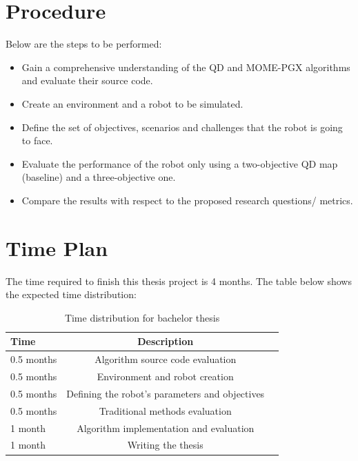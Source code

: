 \documentclass[12pt]{article}
\begin{document}
\section{Procedure}
Below are the steps to be performed:
\begin{itemize}
\item Gain a comprehensive understanding of the QD and MOME-PGX algorithms and evaluate their source code.
\item Create an environment and a robot to be simulated.
\item Define the set of objectives, scenarios and challenges that the robot is going to face.
\item Evaluate the performance of the robot only using a two-objective QD map (baseline) and a three-objective one.
\item Compare the results with respect to the proposed research questions/ metrics.
\end{itemize}

\section{Time Plan}
The time required to finish this thesis project is 4 months. The table below shows the expected time distribution:

\begin{table}[H]
\begin{center}
\begin{tabular}{p{6cm}|cl}
\textbf{Time} 	& \textbf{Description} \\ \hline \hline
0.5 months 	& Algorithm source code evaluation    \\ \hline
0.5 months 	& Environment and robot creation   \\ \hline
0.5 months	& Defining the robot's parameters and objectives   \\ \hline
0.5 months	& Traditional methods evaluation           \\ \hline 
1 month		& Algorithm implementation and evaluation     \\ \hline 
1 month		& Writing the thesis
\end{tabular}
\end{center}
\caption{Time distribution for bachelor thesis \label{tab:aps}}
\end{table}

 


\end{document}

